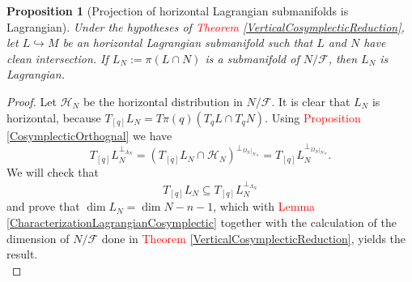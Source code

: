 \documentclass[12pt]{article}
\newtheorem{prop}{Proposition}[section]
\renewcommand{\dim}{\operatorname{dim}}
\begin{document}
\begin{prop}[Projection of horizontal Lagrangian submanifolds is Lagrangian]\label{ProjectionHorizontalLagrangianCosymplectic} Under the hypotheses of \textcolor{red}{Theorem \ref{VerticalCosymplecticReduction}}, let $L \hookrightarrow M$ be an horizontal Lagrangian submanifold such that $L$ and $N$ have clean intersection. If $ L_N:=  \pi(L \cap N)$ is a submanifold of $N/ \mathcal{F}$, then $L_N$ is Lagrangian.
\end{prop}
\begin{proof} Let $\mathcal{H}_N$ be the horizontal distribution in $N/\mathcal{F}$. It is clear that $L_N$ is horizontal, because $T_{[q]}L_N = T\pi(q)(T_qL \cap T_qN)$. Using \textcolor{red}{Proposition \ref{CosymplecticOrthognal}} we have $$T_{[q]}L_N^{\perp_{\Lambda_N}} = (T_{[q]}L_N \cap \mathcal{H}_ N)^{\perp_{\Omega_N|_{\mathcal{H}_N}}}= T_{[q]}L_N^{\perp_{\Omega_N|_{\mathcal{H}_N}}}.$$ We will check that $$T_{[q]}L_N \subseteq T_{[q]}L_N^{\perp_{\Lambda_N}}$$ and prove that $\dim L_N = \dim N- n - 1$, which with \textcolor{red}{Lemma \ref{CharacterizationLagrangianCosymplectic}} together with the calculation of the dimension of $N / \mathcal{F}$ done in \textcolor{red}{Theorem \ref{VerticalCosymplecticReduction}}, yields the result. \\


\end{proof}
\end{document}
